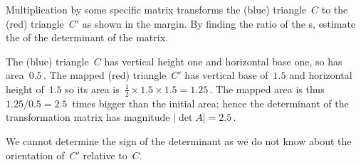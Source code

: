 \begin{example} 
Multiplication by some specific matrix transforms the (blue) triangle~\(C\) to the (red) triangle~\(C'\) as shown in the margin.  By finding the ratio of the s, estimate the  of the determinant of the matrix.
\begin{solution} 
The (blue) triangle~\(C\) has vertical height one and horizontal base one, so has area~\(0.5\)\,.
The mapped (red) triangle~\(C'\) has vertical base of~\(1.5\) and horizontal height of~\(1.5\) so its area is~\(\frac12\times1.5\times1.5=1.25\)\,.
The mapped area is thus \(1.25/0.5=2.5\)~times bigger than the initial area; hence the determinant of the transformation matrix has magnitude \(|\det A|=2.5\)\,.

We cannot determine the sign of the determinant as we do not know about the orientation of~\(C'\) relative to~\(C\).
\end{solution}
\end{example}



